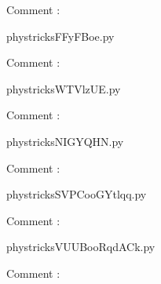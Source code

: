     Comment : 

    \clearpage
    


    \newcommand{\CaptionFigFFyFBoe}{<+Type your caption here+>}
    \begin{center}
        
    \end{center}
    phystricksFFyFBoe.py

    Comment : 

    \clearpage
    


    \newcommand{\CaptionFigWTVlzUE}{<+Type your caption here+>}
    \begin{center}
        
    \end{center}
    phystricksWTVlzUE.py

    Comment : 

    \clearpage
    


    \newcommand{\CaptionFigNIGYQHN}{<+Type your caption here+>}
    \begin{center}
        
    \end{center}
    phystricksNIGYQHN.py

    Comment : 

    \clearpage
    


    \newcommand{\CaptionFigSVPCooGYtlqq}{<+Type your caption here+>}
    \begin{center}
        
    \end{center}
    phystricksSVPCooGYtlqq.py

    Comment : 

    \clearpage
    


    \newcommand{\CaptionFigVUUBooRqdACk}{<+Type your caption here+>}
    \begin{center}
        
    \end{center}
    phystricksVUUBooRqdACk.py

    Comment : 

    \clearpage
    


